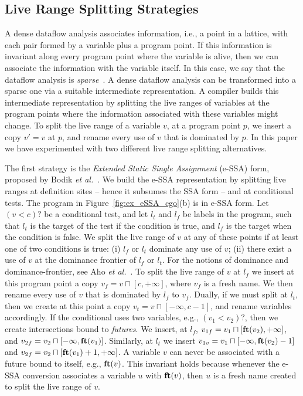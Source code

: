 \documentclass{sigplanconf}[10pt]
\newcommand{\fun}[1]{\mbox{\textbf{#1}}}
\begin{document}
\subsection{Live Range Splitting Strategies}
\label{sub:splitting}

A dense dataflow analysis associates information, i.e., a point in a lattice,
with each pair formed by a variable plus a program point.
If this information is invariant along every program point where the variable
is alive, then we can associate the information with the variable itself.
In this case, we say that the dataflow analysis is {\em sparse}~\cite{Choi91}.
A dense dataflow analysis can be transformed into a sparse one via a suitable
intermediate representation.
A compiler builds this intermediate representation by splitting the live ranges
of variables at the program points where the information associated with these
variables might change.
To split the live range of a variable $v$, at a program point $p$, we insert
a copy $v' = v$ at $p$, and rename every use of $v$ that is dominated by $p$.
In this paper we have experimented with two different live range splitting
alternatives.

The first strategy is the {\em Extended Static Single Assignment} (e-SSA) form,
proposed by Bodik {\em et al.}~\cite{Bodik00}.
We build the e-SSA representation by splitting live ranges at definition sites
-- hence it subsumes the SSA form -- and at conditional tests.
The program in Figure~\ref{fig:ex_eSSA_cgo}(b) is in e-SSA form.
Let $(v < c)?$ be a conditional test, and let $l_t$ and $l_f$ be labels in
the program, such that $l_t$ is the target of the test if the condition is true,
and $l_f$ is the target when the condition is false.
We split the live range of $v$ at any of these points if at least one of two
conditions is true:
(i) $l_f$ or $l_t$ dominate any use of $v$;
(ii) there exist a use of $v$ at the dominance frontier of $l_f$ or $l_t$.
For the notions of dominance and dominance-frontier, see Aho
{\em et al.}~\cite[p.656]{Aho06}.
To split the live range of $v$ at $l_f$ we insert at this
program point a copy $v_f = v \sqcap [c, +\infty]$, where $v_f$ is a fresh name.
We then rename every use of $v$ that is dominated by $l_f$ to $v_f$.
Dually, if we must split at $l_t$, then we create at this point a copy
$v_t = v \sqcap [-\infty, c-1]$, and rename variables accordingly.
If the conditional uses two variables, e.g., $(v_1 < v_2)?$, then we create
intersections bound to {\em futures}.
We insert, at $l_f$, $v_{1f} = v_1 \sqcap [\fun{ft}(v_2), +\infty]$,
and $v_{2f} = v_2 \sqcap [-\infty, \fun{ft}(v_1)]$.
Similarly, at $l_t$ we insert
$v_{1v} = v_1 \sqcap [-\infty, \fun{ft}(v_2) - 1]$
and $v_{2f} = v_2 \sqcap [\fun{ft}(v_1) + 1, +\infty]$.
A variable $v$ can never be associated with a future bound to
itself, e.g., $\fun{ft}(v)$.
This invariant holds because whenever the e-SSA conversion associates a variable
$u$ with $\fun{ft}(v)$, then $u$ is a fresh name created to split the live range
of $v$.
\end{document}

